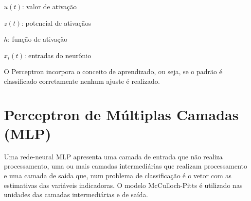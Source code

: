 \documentclass[11pt,a4paper]{article}
\numberwithin{equation}{section}
\begin{document}
$u(t)$: valor de ativação

$z(t)$: potencial de ativaçãos

$h$: função de ativação

$x_i(t)$: entradas do neurônio

O Perceptron incorpora o conceito de aprendizado, ou seja, se o padrão é classificado corretamente nenhum ajuste é realizado.
\section{Perceptron de Múltiplas Camadas (MLP)}
Uma rede-neural MLP apresenta uma camada de entrada que não realiza processamento, uma ou mais camadas intermediárias que realizam processamento e uma camada de saída que, num problema de classificação é o vetor com as estimativas das variáveis indicadoras. O modelo McCulloch-Pitts é utilizado nas unidades das camadas intermediárias e de saída.
\end{document}
